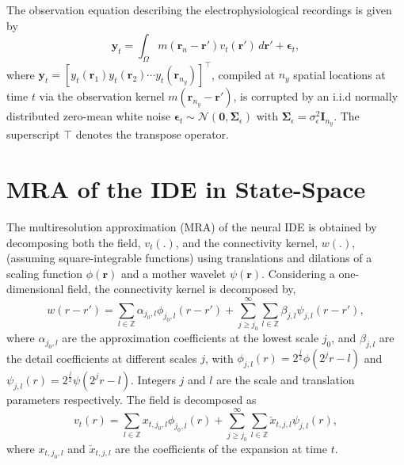 \documentclass[journal,a4paper]{IEEEtran}
\begin{document}
The observation equation describing the electrophysiological recordings is given by 
\begin{equation}\label{eq:ObservationEquation}
	\mathbf y_t = \int_{\Omega} { m\left(\mathbf{r}_{n}-\mathbf{r}'\right) v_t\left(\mathbf{r}'\right) \, d\mathbf{r}'} + \boldsymbol\epsilon_t, 
\end{equation}
where $\mathbf{y}_{t} = [y_t(\mathbf{r}_1) y_t(\mathbf{r}_2) \cdots y_t(\mathbf{r}_{n_y})]^\top$, compiled at $n_{y}$ spatial locations at time $t$ via the observation kernel $m\left(\mathbf{r}_{n_y}-\mathbf{r}'\right)$, is corrupted by an i.i.d normally distributed zero-mean white noise $\boldsymbol{\epsilon}_{t}\sim \mathcal{N}\left(\mathbf{0},\mathbf{\Sigma}_{\epsilon}\right)$ with $\mathbf{\Sigma}_{\epsilon}=\sigma_{\epsilon}^2\mathbf I_{n_y} $. The superscript $\top$ denotes the transpose operator.
\section{MRA of the IDE in State-Space}
The multiresolution approximation (MRA) of the neural IDE is obtained by decomposing both the field, $v_t(.)$, and the connectivity kernel, $w(.)$, (assuming square-integrable functions) using translations and dilations of a scaling function $\phi(\mathbf{r})$ and a mother wavelet $\psi(\mathbf{r})$. Considering a one-dimensional field, the connectivity kernel is decomposed by,
\begin{equation}
 w\left(r-r'\right)=\sum_{l \in \mathbb{Z}}\alpha_{j_0,l}\phi_{j_0,l}\left(r-r'\right)+\sum_{j\geq j_0}^{\infty} \sum_{l \in \mathbb{Z}}\beta_{j,l}\psi_{j,l}\left(r-r'\right), 
\label{eq:KernelExpansion}
\end{equation}
where $\alpha_{j_0,l}$ are the approximation coefficients at the lowest scale $j_0$, and $\beta_{j,l}$ are the detail coefficients at different scales $j$, with $\phi_{j,l}\left(r\right)=2^{\frac{j}{2}}\phi\left(2^jr-l\right) $ and $\psi_{j,l}\left(r\right)=2^{\frac{j}{2}}\psi\left(2^jr-l\right)$. Integers $j$ and $l$ are the scale and translation parameters respectively. The field is decomposed as
\begin{equation}
 v_t\left(r\right)=\sum_{l \in \mathbb{Z}}x_{t,j_{0},l}\phi_{j_{0},l}\left(r\right)+\sum_{j\geq j_0}^{\infty} \sum_{l \in \mathbb{Z}} \check{x}_{t,j,l}\psi_{j,l}\left(r\right),
\label{eq:FieldExpansion}
\end{equation}
where $ x_{t,j_{0},l}$ and $\check{x}_{t,j,l} $ are the coefficients of the expansion at time $t$.
\end{document}
